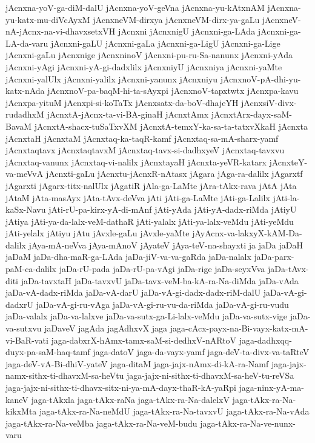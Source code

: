 {jAcnxna-yoV-ga-diM-dalU
jAcnxna-yoV-geVna
jAcnxna-yu-kAtxnAM
jAcnxna-yu-katx-mu-diVcAyxM
jAcnxneVM-dirxya
jAcnxneVM-dirx-ya-gaLu
jAcnxneV-nA-jAcnx-na-vi-dhavxsetxVH
jAcnxni
jAcnxnigU
jAcnxni-ga-LAda
jAcnxni-ga-LA-da-varu
jAcnxni-gaLU
jAcnxni-gaLa
jAcnxni-ga-LigU
jAcnxni-ga-Lige
jAcnxni-gaLu
jAcnxnige
jAcnxninoV
jAcnxni-pu-ru-Sa-nanunx
jAcnxni-yAda
jAcnxni-yAgi
jAcnxni-yA-gi-dadxlilx
jAcnxniyU
jAcnxniya
jAcnxni-yaMte
jAcnxni-yalUlx
jAcnxni-yalilx
jAcnxni-yanunx
jAcnxniyu
jAcnxnoV-pA-dhi-yu-katx-nAda
jAcnxnoV-pa-baqM-hi-ta-sAyxpi
jAcnxnoV-tapxtwtx
jAcnxpa-kavu
jAcnxpa-yituM
jAcnxpi-si-koTaTx
jAcnxsatx-da-boV-dhajeYH
jAcnxsiV-divx-rudadhxM
jAcnxtA-jAcnx-ta-vi-BA-ginaH
jAcnxtAmx
jAcnxtArx-dayx-saM-BavaM
jAcnxtA-shacx-tuSaTxvXM
jAcnxtA-temxY-ka-sa-ta-tatxvXkaH
jAcnxta
jAcnxtaH
jAcnxtaM
jAcnxtaq-ka-taqR-kamf
jAcnxtaq-sa-mA-sharx-yamf
jAcnxtaqtavx
jAcnxtaqtavxM
jAcnxtaq-tavx-si-dadhxyeV
jAcnxtaq-tavxvu
jAcnxtaq-vanunx
jAcnxtaq-vi-nalilx
jAcnxtayaH
jAcnxta-yeVR-katarx
jAcnxteY-va-meVvA
jAcnxti-gaLu
jAcnxtu-jAcnxR-nAtasx
jAgara
jAga-ra-dalilx
jAgarxtf
jAgarxti
jAgarx-titx-nalUlx
jAgatiR
jAla-ga-LaMte
jAra-tAkx-rava
jAtA
jAta
jAtaM
jAta-masAyx
jAta-tAvx-deVva
jAti
jAti-ga-LaMte
jAti-ga-Lalilx
jAti-la-kaSx-Navu
jAti-rU-pa-kirx-yA-di-mAnf
jAti-yAda
jAti-yA-dadx-riMda
jAtiyU
jAtiya
jAti-ya-da-lalx-veM-dathaR
jAti-yalalx
jAti-ya-lalx-veMdu
jAti-yeMdu
jAti-yelalx
jAtiyu
jAtu
jAvxle-gaLu
jAvxle-yaMte
jAyAcnx-va-lakxyX-kAM-Da-dalilx
jAya-mA-neVva
jAya-mAnoV
jAyateV
jAya-teV-na-shayxti
ja
jaDa
jaDaH
jaDaM
jaDa-dha-maR-ga-LAda
jaDa-jiV-va-va-gaRda
jaDa-nalalx
jaDa-parx-paM-ca-dalilx
jaDa-rU-pada
jaDa-rU-pa-vAgi
jaDa-rige
jaDa-seyxVva
jaDa-tAvx-diti
jaDa-tavxtaH
jaDa-tavxvU
jaDa-tavx-veM-ba-kA-ra-Na-diMda
jaDa-vAda
jaDa-vA-dadx-riMda
jaDa-vA-darU
jaDa-vA-gi-dadx-dadx-riM-dalU
jaDa-vA-gi-dadxrU
jaDa-vA-gi-ru-vAga
jaDa-vA-gi-ru-vu-da-riMda
jaDa-vA-gi-ru-vudu
jaDa-valalx
jaDa-va-lalxve
jaDa-va-sutx-ga-Li-lalx-veMdu
jaDa-va-sutx-vige
jaDa-va-sutxvu
jaDaveV
jagAda
jagAdhxvX
jaga
jaga-cAcx-payx-na-Bi-vayx-katx-mA-vi-BaR-vati
jaga-dabxrX-hAmx-tamx-saM-si-dedhxV-nARtoV
jaga-dadhxqq-duyx-pa-saM-haq-tamf
jaga-datoV
jaga-da-vayx-yamf
jaga-deV-ta-divx-va-taRteV
jaga-deV-vA-Bi-dhiV-yateV
jaga-ditaM
jaga-jajx-nAmx-di-kA-ra-Namf
jaga-jajx-namx-sithx-ti-dhavxM-sa-heVtu
jaga-jajx-ni-sithx-ti-dhavxM-sa-heV-tu-reVSa
jaga-jajx-ni-sithx-ti-dhavx-sitx-ni-ya-mA-dayx-thaR-kA-yaRpi
jaga-ninx-yA-ma-kaneV
jaga-tAkxla
jaga-tAkx-raNa
jaga-tAkx-ra-Na-dalelxV
jaga-tAkx-ra-Na-kikxMta
jaga-tAkx-ra-Na-neMdU
jaga-tAkx-ra-Na-tavxvU
jaga-tAkx-ra-Na-vAda
jaga-tAkx-ra-Na-veMba
jaga-tAkx-ra-Na-veM-budu
jaga-tAkx-ra-Na-ve-nunx-varu
}
